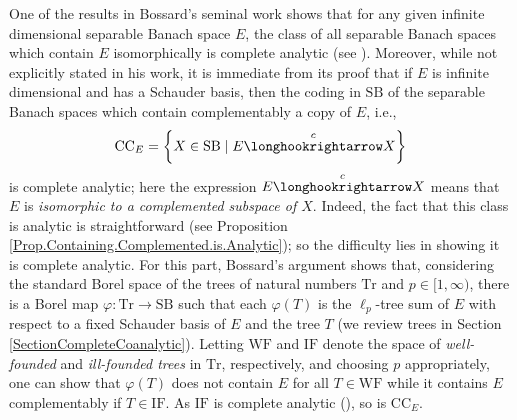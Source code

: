 \documentclass[letterpaper]{amsart}
\numberwithin{equation}{section}
\theoremstyle{definition}
\newcommand{\WF}{\mathrm{WF}}
\newcommand{\IF}{\mathrm{IF}}
\newcommand{\Tr}{\mathrm{Tr}}
\newcommand{\SB}{\mathrm{SB}}
\begin{document}
 







   One of the  results in Bossard's seminal work shows that for any given infinite dimensional separable Banach space $E$, the class of all separable Banach spaces which contain $E$ isomorphically is complete analytic (see  \cite[Corollary 3.3]{Bossard2002Fund}). Moreover, while not explicitly stated in his work, it is immediate from its proof that  if $E$ is infinite dimensional and has a Schauder basis, then the coding in $\SB$ of the separable Banach spaces which contain complementably a copy of $E$, i.e., 
\[\mathrm{CC}_E=\left\{X\in \SB\mid E\overset{c}\longhookrightarrow X\right\}\]
 is complete analytic; here the expression $E\overset{c}\longhookrightarrow X$ means that   $E$ is \emph{isomorphic to a complemented subspace of $X$}. Indeed, the fact that this class is analytic is straightforward (see Proposition \ref{Prop.Containing.Complemented.is.Analytic}); so the difficulty lies in showing it is complete analytic. For this part, Bossard's argument shows that,  considering   the standard Borel space of the trees of natural numbers $\mathrm{Tr}$ and  $p\in [1,\infty)$, there is a  Borel map $\varphi\colon \Tr\to \SB$  such that each $\varphi(T)$ is the $\ell_p$-tree sum of $E$ with respect to a fixed  Schauder basis of $E$ and the tree $T$  (we review trees in Section \ref{SectionCompleteCoanalytic}). Letting $\WF$ and $\IF$ denote the space of  \emph{well-founded} and \emph{ill-founded trees} in $\Tr$, respectively, and choosing $p$ appropriately, one can show that     $\varphi(T)$ does not contain $E$ for all $T\in \WF$ while  it contains $E$ complementably if $T\in \IF$. As $\IF$ is complete analytic (\cite[Theorem 27.1]{KechrisBook1995}), so is $\mathrm{CC}_E$.
\end{document}
